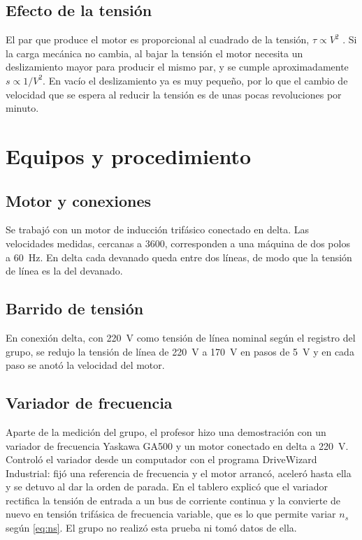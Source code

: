 \documentclass[conference]{IEEEtran}
\begin{document}
\subsection{Efecto de la tensión}
El par que produce el motor es proporcional al cuadrado de la tensión, $\tau\propto V^2$ \cite{chapman}. Si la carga mecánica no cambia, al bajar la tensión el motor necesita un deslizamiento mayor para producir el mismo par, y se cumple aproximadamente $s\propto1/V^2$. En vacío el deslizamiento ya es muy pequeño, por lo que el cambio de velocidad que se espera al reducir la tensión es de unas pocas revoluciones por minuto.

\section{Equipos y procedimiento}
\subsection{Motor y conexiones}
Se trabajó con un motor de inducción trifásico conectado en delta. Las velocidades medidas, cercanas a \SI{3600}{\rpm}, corresponden a una máquina de dos polos a \SI{60}{Hz}. En delta cada devanado queda entre dos líneas, de modo que la tensión de línea es la del devanado.

\subsection{Barrido de tensión}
En conexión delta, con \SI{220}{V} como tensión de línea nominal según el registro del grupo, se redujo la tensión de línea de \SI{220}{V} a \SI{170}{V} en pasos de \SI{5}{V} y en cada paso se anotó la velocidad del motor.

\subsection{Variador de frecuencia}
Aparte de la medición del grupo, el profesor hizo una demostración con un variador de frecuencia Yaskawa GA500 y un motor conectado en delta a \SI{220}{V}. Controló el variador desde un computador con el programa DriveWizard Industrial: fijó una referencia de frecuencia y el motor arrancó, aceleró hasta ella y se detuvo al dar la orden de parada. En el tablero explicó que el variador rectifica la tensión de entrada a un bus de corriente continua y la convierte de nuevo en tensión trifásica de frecuencia variable, que es lo que permite variar $n_s$ según \eqref{eq:ns}. El grupo no realizó esta prueba ni tomó datos de ella.
\end{document}
